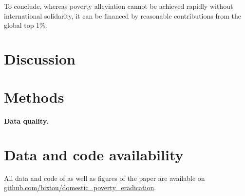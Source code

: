 To conclude, whereas poverty alleviation cannot be achieved rapidly without international solidarity, it can be financed by reasonable contributions from the global top 1\%.


\section{Discussion} 


  \begin{small} %
\section*{\normalsize Methods}\label{sec:methods} %
\paragraph{\small Data quality.} %


\section*{\normalsize Data and code availability}

All data and code of as well as figures of the paper are available on \href{https://github.com/bixiou/domestic_poverty_eradication}{github.com/bixiou/domestic\_poverty\_eradication}. 

\end{small}  %

